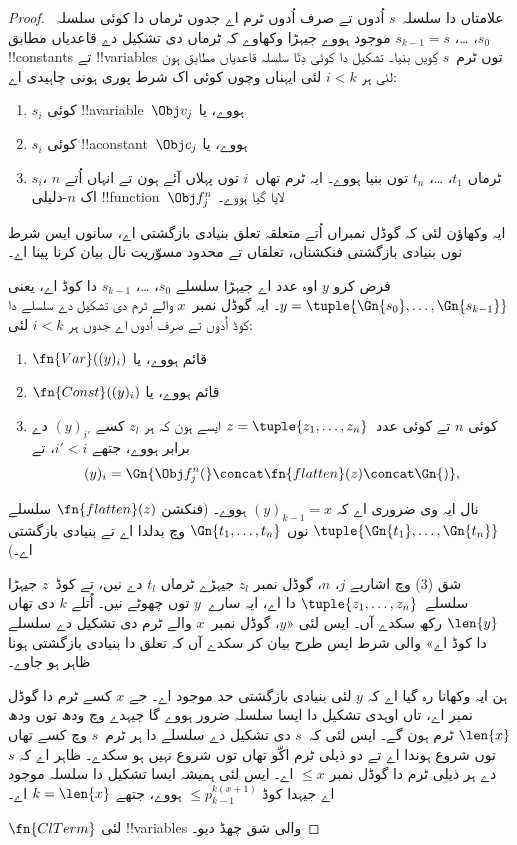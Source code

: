 \documentclass[../../../include/open-logic-section]{subfiles}
\begin{document}
\begin{proof}
علامتاں دا سلسلہ~$s$ اُدوں تے صرف اُدوں ٹرم اے جدوں ٹرماں دا
کوئی سلسلہ~$s_0$، \dots، $s_{k-1} = s$ موجود ہووے جیہڑا وکھاوے
کہ ٹرماں دی تشکیل دے قاعدیاں مطابق !!{constant}s تے !!{variable}s
توں ٹرم~$s$ کِویں بنیا۔ تشکیل دا کوئی دِتّا سلسلہ قاعدیاں مطابق ہون لئی ہر $i < k$ لئی
ایہناں وچوں کوئی اک شرط پوری ہونی چاہیدی اے:
\begin{enumerate}
\item $s_i$ کوئی !!a{variable}~$\Obj v_j$ ہووے، یا
\item $s_i$ کوئی !!a{constant}~$\Obj c_j$ ہووے، یا
\item $s_i$، $n$ ٹرماں $t_1$، \dots، $t_n$ توں بنیا ہووے۔
  ایہ ٹرم تھاں~$i$ توں پہلاں آئے ہون تے انہاں اُتے اک
  $n$-دلیلی !!{function}~$\Obj f^n_j$ لایا گیا ہووے۔
\end{enumerate}
ایہ وکھاؤن لئی کہ گوڈل نمبراں اُتے متعلقہ تعلق بنیادی بازگشتی
اے، سانوں ایس شرط نوں بنیادی بازگشتی فنکشناں، تعلقاں تے
محدود مسوّریت نال بیان کرنا پینا اے۔

فرض کرو $y$ اوہ عدد اے جیہڑا سلسلے $s_0$، \dots، $s_{k-1}$
دا کوڈ اے، یعنی $y = \tuple{\Gn{s_0}, \dots, \Gn{s_{k-1}}}$۔
ایہ گوڈل نمبر~$x$ والے ٹرم دی تشکیل دے سلسلے دا کوڈ اُدوں
تے صرف اُدوں اے جدوں ہر $i < k$ لئی:
\begin{enumerate}
\item $\fn{Var}((y)_i)$ قائم ہووے، یا
\item $\fn{Const}((y)_i)$ قائم ہووے، یا
\item کوئی $n$ تے کوئی عدد~$z = \tuple{z_1, \dots, z_n}$ ایسے
  ہون کہ ہر $z_l$ کسے $(y)_{i'}$ دے برابر ہووے، جتھے
  $i' < i$، تے
\[
(y)_i = \Gn{\Obj f^n_j(} \concat \fn{flatten}(z) \concat \Gn{)},
\]
\end{enumerate}
نال ایہ وی ضروری اے کہ $(y)_{k-1} = x$ ہووے۔
(فنکشن $\fn{flatten}(z)$ سلسلے $\tuple{\Gn{t_1}, \dots, \Gn{t_n}}$
نوں $\Gn{t_1, \dots, t_n}$ وچ بدلدا اے تے بنیادی بازگشتی اے۔)

شق (3) وچ اشاریے $j$، $n$، گوڈل نمبر $z_l$ جیہڑے ٹرماں $t_l$
دے نیں، تے کوڈ~$z$ جیہڑا سلسلے~$\tuple{z_1, \dots, z_n}$ دا اے،
ایہ سارے~$y$ توں چھوٹے نیں۔ اُتلے $k$ دی تھاں
$\len{y}$ رکھ سکدے آں۔ ایس لئی «$y$، گوڈل نمبر~$x$ والے ٹرم دی
تشکیل دے سلسلے دا کوڈ اے» والی شرط ایس طرح بیان کر سکدے آں کہ
تعلق دا بنیادی بازگشتی ہونا ظاہر ہو جاوے۔

ہن ایہ وکھانا رہ گیا اے کہ $y$ لئی بنیادی بازگشتی حد موجود اے۔
جے $x$ کسے ٹرم دا گوڈل نمبر اے، تاں اوہدی تشکیل دا ایسا
سلسلہ ضرور ہووے گا جیہدے وچ ودھ توں ودھ $\len{x}$ ٹرم ہون گے۔
ایس لئی کہ~$s$ دی تشکیل دے سلسلے دا ہر ٹرم~$s$ وچ کسے تھاں
توں شروع ہوندا اے تے دو ذیلی ٹرم اکّو تھاں توں شروع نہیں ہو سکدے۔
ظاہر اے کہ $s$ دے ہر ذیلی ٹرم دا گوڈل نمبر $\le x$ اے۔ ایس لئی ہمیشہ
ایسا تشکیل دا سلسلہ موجود اے جیہدا کوڈ
$\le p_{k-1}^{k(x+1)}$ ہووے، جتھے $k=\len{x}$ اے۔

$\fn{ClTerm}$ لئی !!{variable}s والی شق چھڈ دیو۔
\end{proof}
\end{document}
